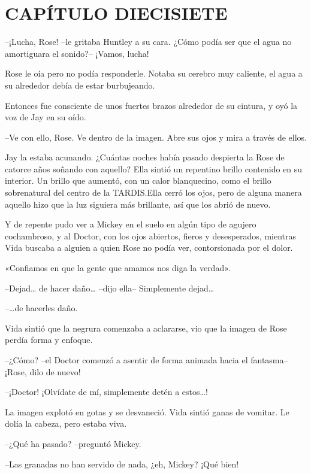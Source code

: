 \chapter*{CAPÍTULO DIECISIETE}

{--¡Lucha, Rose! --le gritaba Huntley a su cara. ¿Cómo podía ser que el
agua no amortiguara el sonido?-- ¡Vamos, lucha!}

{Rose le oía pero no podía responderle. Notaba su cerebro muy caliente,
el agua a su alrededor debía de estar burbujeando.}

{Entonces fue consciente de unos fuertes brazos alrededor de su cintura,
y oyó la voz de Jay en su oído.}

{--Ve con ello, Rose. Ve dentro de la imagen. Abre sus ojos y mira a
través de ellos.}

{Jay la estaba acunando. ¿Cuántas noches había pasado despierta la Rose
 de catorce años soñando con aquello? Ella sintió un repentino brillo
 contenido en su interior. Un brillo que aumentó, con un calor
 blanquecino, como el brillo sobrenatural del centro de la TARDIS.\@ Ella
 cerró los ojos, pero de alguna manera aquello hizo que la luz siguiera
más brillante, así que los abrió de nuevo.}

{Y de repente pudo ver a Mickey en el suelo en algún tipo de agujero
 cochambroso, y al Doctor, con los ojos abiertos, fieros y desesperados,
 mientras Vida buscaba a alguien a quien Rose no podía ver, contorsionada
por el dolor.}

{«Confiamos en que la gente que amamos nos diga la verdad».}

{--Dejad\ldots{} de hacer daño\ldots{} --dijo ella-- Simplemente
 dejad\ldots{}}

\mbox{}

{--\ldots{}de hacerles daño.}

{Vida sintió que la negrura comenzaba a aclararse, vio que la imagen de
Rose perdía forma y enfoque.}

{--¿Cómo? --el Doctor comenzó a asentir de forma animada hacia el
fantasma-- ¡Rose, dilo de nuevo!}

{--¡Doctor! ¡Olvídate de mí, simplemente detén a estos\ldots{}!}

{La imagen explotó en gotas y se desvaneció. Vida sintió ganas de
vomitar. Le dolía la cabeza, pero estaba viva.}

{--¿Qué ha pasado? --preguntó Mickey.}

{--Las granadas no han servido de nada, ¿eh, Mickey? ¡Qué bien!}


